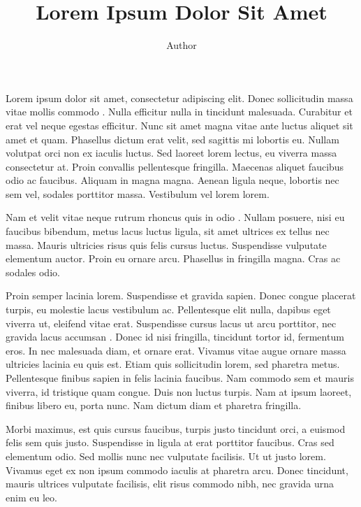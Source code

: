 \documentclass[man, 12pt]{apa7}
\title{Lorem Ipsum Dolor Sit Amet}
\author{Author}
\affiliation{Class Name}
\begin{document}
\thispagestyle{empty}
\addtocounter{page}{-1}
\maketitle
Lorem ipsum dolor sit amet, consectetur adipiscing elit. Donec sollicitudin massa vitae mollis commodo \parencite{TagA}. Nulla efficitur nulla in tincidunt malesuada. 
Curabitur et erat vel neque egestas efficitur. Nunc sit amet magna vitae ante luctus aliquet sit amet et quam. Phasellus dictum erat velit, sed sagittis mi lobortis eu. 
Nullam volutpat orci non ex iaculis luctus. Sed laoreet lorem lectus, eu viverra massa consectetur at. Proin convallis pellentesque fringilla. Maecenas aliquet faucibus odio ac faucibus. 
Aliquam in magna magna. Aenean ligula neque, lobortis nec sem vel, sodales porttitor massa. Vestibulum vel lorem lorem.

Nam et velit vitae neque rutrum rhoncus quis in odio \parencite{TagC}. Nullam posuere, nisi eu faucibus bibendum, metus lacus luctus ligula, sit amet ultrices ex tellus nec massa. 
Mauris ultricies risus quis felis cursus luctus. Suspendisse vulputate elementum auctor. Proin eu ornare arcu. Phasellus in fringilla magna. Cras ac sodales odio.

Proin semper lacinia lorem. Suspendisse et gravida sapien. Donec congue placerat turpis, eu molestie lacus vestibulum ac. Pellentesque elit nulla, dapibus eget viverra ut, eleifend vitae erat. 
Suspendisse cursus lacus ut arcu porttitor, nec gravida lacus accumsan \parencite{TagB}. Donec id nisi fringilla, tincidunt tortor id, fermentum eros. In nec malesuada diam, et ornare erat. 
Vivamus vitae augue ornare massa ultricies lacinia eu quis est. Etiam quis sollicitudin lorem, sed pharetra metus. Pellentesque finibus sapien in felis lacinia faucibus. 
Nam commodo sem et mauris viverra, id tristique quam congue. Duis non luctus turpis. Nam at ipsum laoreet, finibus libero eu, porta nunc. Nam dictum diam et pharetra fringilla.

Morbi maximus, est quis cursus faucibus, turpis justo tincidunt orci, a euismod felis sem quis justo. Suspendisse in ligula at erat porttitor faucibus. Cras sed elementum odio. 
Sed mollis nunc nec vulputate facilisis. Ut ut justo lorem. Vivamus eget ex non ipsum commodo iaculis at pharetra arcu.
Donec tincidunt, mauris ultrices vulputate facilisis, elit risus commodo nibh, nec gravida urna enim eu leo.
\printbibliography
\end{document}
